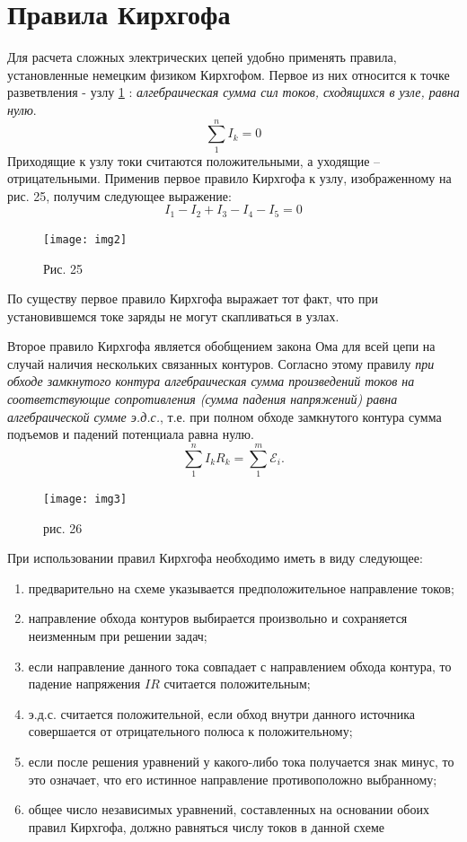 \documentclass[a4paper,10pt]{book}
\begin{document}
\section{Правила Кирхгофа}
Для расчета сложных электрических цепей удобно применять правила, установленные немецким физиком Кирхгофом. Первое из них относится к точке разветвления - узлу \ref{img2} : \emph{алгебраическая сумма сил токов, сходящихся в узле, равна нулю}.
\begin{equation}\label{kirchgoff1}
 \sum_1^n I_k = 0
\end{equation}
Приходящие к узлу токи считаются положительными, а уходящие -- отрицательными. Применив первое правило Кирхгофа к узлу, изображенному на рис. 25, получим следующее выражение:
\begin{equation}
 I_1 - I_2 + I_3 - I_4 - I_5 = 0\nonumber
\end{equation}
\begin{figure}[h]
\texttt{[image: img2]}
\caption{Рис. 25}
\label{img2}
\end{figure}
По существу первое правило Кирхгофа выражает тот факт, что при установившемся токе заряды не могут скапливаться в узлах.

Второе правило Кирхгофа является обобщением закона Ома для всей цепи на случай наличия нескольких связанных контуров. Согласно этому правилу \emph{при обходе замкнутого контура алгебраическая сумма произведений токов на соответствующие сопротивления (сумма падения напряжений) равна алгебраической сумме э.д.с.}, т.е. при полном обходе замкнутого контура сумма подъемов и падений потенциала равна нулю.
\begin{equation}\label{kirchgoff2}
 \sum_1^n I_kR_k = \sum_1^m\mathcal{E}_i.
\end{equation}
\begin{figure}[h]
\texttt{[image: img3]}
\caption{рис. 26}
\label{img3}
\end{figure}
При использовании правил Кирхгофа необходимо иметь в виду следующее:
\begin{enumerate}
 \item предварительно на схеме указывается предположительное направление токов;
 \item направление обхода контуров выбирается произвольно и сохраняется неизменным при решении задач;
 \item если направление данного тока совпадает с направлением обхода контура, то падение напряжения $IR$ считается положительным;
 \item э.д.с. считается положительной, если обход внутри данного источника совершается от отрицательного полюса к положительному;
 \item если после решения уравнений у какого-либо тока получается знак минус, то это означает, что его истинное направление противоположно выбранному;
 \item общее число независимых уравнений, составленных на основании обоих правил Кирхгофа, должно равняться числу токов в данной схеме
\end{enumerate}
\end{document}
